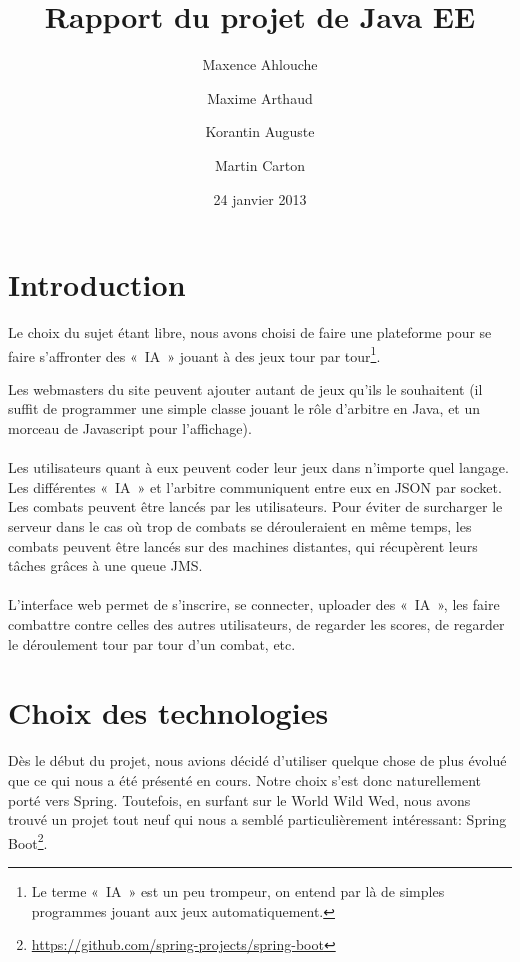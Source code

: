 \documentclass[10pt]{scrartcl}
\begin{document}
\title{Rapport du projet de Java EE}
\author{Maxence Ahlouche \and Maxime Arthaud \and Korantin Auguste \and Martin Carton}

\date{24 janvier 2013}
\maketitle

\section{Introduction}
  Le choix du sujet étant libre, nous avons choisi de faire une plateforme pour
  se faire s'affronter des «~IA~» jouant à des jeux tour par tour\footnote{Le
  terme «~IA~» est un peu trompeur, on entend par là de simples programmes
  jouant aux jeux automatiquement.}.

  Les webmasters du site peuvent ajouter autant de jeux qu'ils le souhaitent
  (il suffit de programmer une simple classe jouant le rôle d'arbitre en Java,
  et un morceau de Javascript pour l'affichage).

  \paragraph{}
  Les utilisateurs quant à eux peuvent coder leur jeux dans n'importe quel
  langage. Les différentes «~IA~» et l'arbitre communiquent entre eux en JSON
  par socket. Les combats peuvent être lancés par les utilisateurs. Pour éviter
  de surcharger le serveur dans le cas où trop de combats se dérouleraient en
  même temps, les combats peuvent être lancés sur des machines distantes, qui
  récupèrent leurs tâches grâces à une queue JMS.

  \paragraph{}
  L'interface web permet de s'inscrire, se connecter, uploader des «~IA~», les
  faire combattre contre celles des autres utilisateurs, de regarder les
  scores, de regarder le déroulement tour par tour d'un combat, etc.

\section{Choix des technologies}
  Dès le début du projet, nous avions décidé d'utiliser quelque chose
  de plus évolué que ce qui nous a été présenté en cours. Notre choix
  s'est donc naturellement porté vers Spring. Toutefois, en surfant
  sur le World Wild Wed, nous avons trouvé un projet
  tout neuf qui nous a semblé particulièrement intéressant: Spring
  Boot\footnote{\url{https://github.com/spring-projects/spring-boot}}.
\end{document}
